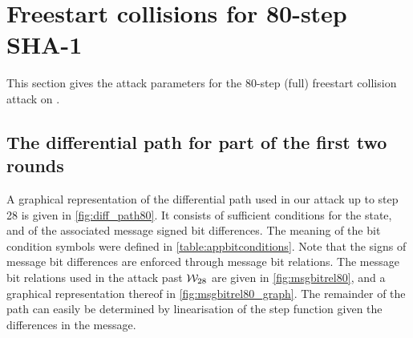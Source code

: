 \section{Freestart collisions for 80-step SHA-1}
\label{sec:res_80}

This section gives the attack parameters for the 80-step (full) freestart collision attack on \shaone.

\subsection{The differential path for part of the first two rounds}
\label{sec:app_diff_path80}

A graphical representation of the differential path
used in our attack up to step 28 is given in \autoref{fig:diff_path80}.
It consists of sufficient conditions for the state, and of the associated message signed bit differences.
The meaning of the bit condition symbols were defined in \autoref{table:appbitconditions}.
Note that the signs of message bit differences are enforced through message bit relations.
The message bit relations
used in the attack past $\mathcal{W}_{28}$ are given in \autoref{fig:msgbitrel80}, and a graphical
representation thereof in
\autoref{fig:msgbitrel80_graph}.
The remainder of the path can easily be determined by linearisation of the step function given the differences
in the message.

